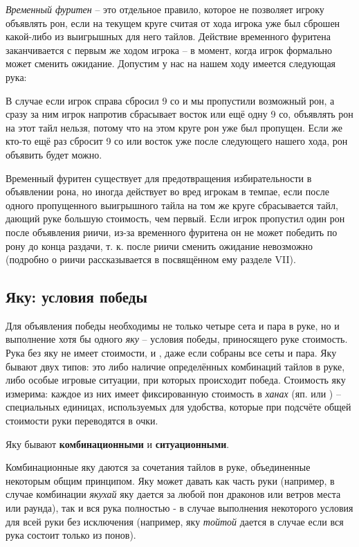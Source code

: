 \textit{Временный фуритен} – это отдельное правило, которое не позволяет игроку объявлять рон, если на текущем круге считая от хода игрока уже был сброшен какой-либо из выигрышных для него тайлов. Действие временного фуритена заканчивается с первым же ходом игрока – в момент, когда игрок формально может сменить ожидание. Допустим у нас на нашем ходу имеется следующая рука:


В случае если игрок справа сбросил 9 со и мы пропустили возможный рон, а сразу за ним игрок напротив сбрасывает восток или ещё одну 9 со, объявлять рон на этот тайл нельзя, потому что на этом круге рон уже был пропущен. Если же кто-то ещё раз сбросит 9 со или восток уже после следующего нашего хода, рон объявить будет можно.

Временный фуритен существует для предотвращения избирательности в объявлении рона, но иногда действует во вред игрокам в темпае, если после одного пропущенного выигрышного тайла на том же круге сбрасывается тайл, дающий руке большую стоимость, чем первый. Если игрок пропустил один рон после объявления риичи, из-за временного фуритена он не может победить по рону до конца раздачи, т. к. после риичи сменить ожидание невозможно (подробно о риичи рассказывается в посвящённом ему разделе VII).

\subsection{Яку: условия победы}

Для объявления победы необходимы не только четыре сета и пара в руке, но и выполнение хотя бы одного \textit{яку} – условия победы, приносящего руке стоимость. Рука без яку не имеет стоимости, и , даже если собраны все сеты и пара. Яку бывают двух типов: это либо наличие определённых комбинаций тайлов в руке, либо особые игровые ситуации, при которых происходит победа. Стоимость яку измерима: каждое из них имеет фиксированную стоимость в \textit{ханах} (яп.  или ) – специальных единицах, используемых для удобства, которые при подсчёте общей стоимости руки переводятся в очки.

Яку бывают \textbf{комбинационными} и \textbf{ситуационными}. 

Комбинационные яку даются за сочетания тайлов в руке, объединенные некоторым общим принципом. Яку может давать как часть руки (например, в случае комбинации \textit{якухай} яку дается за любой пон драконов или ветров места или раунда), так и вся рука полностью - в случае выполнения некоторого условия для всей руки без исключения (например, яку \textit{тойтой} дается в случае если вся рука состоит только из понов). 


